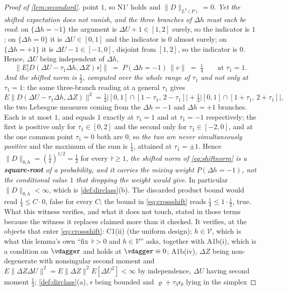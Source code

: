 \begin{proof}[Proof of \cref{lem:secondord}]
point $1$, so N1$'$ holds and $\|D\|_{L^{2}(P)}=0$. \emph{Yet the shifted expectation does not
vanish, and the three branches of $\Delta h$ must each be read}: on $\{\Delta h=-1\}$ the argument is
$\Delta U+1\in[1,2]$ surely, so the indicator is $1$; on $\{\Delta h=0\}$ it is $\Delta U\in[0,1]$ and
the indicator is $0$ almost surely; on $\{\Delta h=+1\}$ it is $\Delta U-1\in[-1,0]$, disjoint from
$[1,2]$, so the indicator is $0$. Hence, $\Delta U$ being independent of $\Delta h$,
\[
\big\|E\big[D(\Delta U-\tau_1\Delta h,\Delta Z)\,\mathsf r\big]\big\|
\;=\;P(\Delta h=-1)\,\|v\|\;=\;\tfrac14
\qquad\text{at }\tau_1=1 .
\]
\emph{And the shifted norm is $\tfrac12$, computed over the whole range of $\tau_1$ and not only at
$\tau_1=1$}: the same three-branch reading at a general $\tau_1$ gives
\[
E\big\|D(\Delta U-\tau_1\Delta h,\Delta Z)\big\|^{2}
=\tfrac14\big|[0,1]\cap[1-\tau_1,\,2-\tau_1]\big|
+\tfrac14\big|[0,1]\cap[1+\tau_1,\,2+\tau_1]\big| ,
\]
the two Lebesgue measures coming from the $\Delta h=-1$ and $\Delta h=+1$ branches. Each is at most
$1$, and equals $1$ exactly at $\tau_1=1$ and at $\tau_1=-1$ respectively; the first is positive only
for $\tau_1\in[0,2]$ and the second only for $\tau_1\in[-2,0]$, and at the one common point $\tau_1=0$
both are $0$, so \emph{the two are never simultaneously positive} and the maximum of the sum is
$\tfrac14$, attained at $\tau_1=\pm1$. Hence
$\|D\|_{0,h}=(\tfrac14)^{1/2}=\tfrac12$ for every $\bar\tau\ge1$, \emph{the shifted norm of
\eqref{eq:shiftnorm} is a \textbf{square-root} of a probability, and it carries the mixing weight
$P(\Delta h=-1)$, not the conditional value $1$ that dropping the weight would give}. In particular
$\|D\|_{0,h}<\infty$, which is \cref{def:dirclass}(b).
The discarded product bound would read $\tfrac14\le C\cdot0$, false for every $C$; the bound in
\eqref{eq:crossshift} reads $\tfrac14\le1\cdot\tfrac12$, true.
What this witness verifies, and what it does not touch, stated in those terms because the
witness it replaces claimed more than it checked. It verifies, at the objects that enter
\eqref{eq:crossshift}: C1(ii) (the uniform design); $h\in\mathcal V$, which is what this lemma's own
``fix $\bar\tau>0$ and $h\in\mathcal V$'' asks, together with A1b(i), which is a condition on $\vdagger$
and holds at $\vdagger\equiv0$;
A1b(iv), $\Delta Z$ being non-degenerate with nonsingular second moment and
$E\|\Delta Z\Delta U\|^{2}=E\|\Delta Z\|^{2}E[\Delta U^{2}]<\infty$ by independence, $\Delta U$ having
second moment $\tfrac13$;
\cref{def:dirclass}(a), $\mathsf r$ being bounded and $\varrho+\tau_3\mathsf r_0$ lying in the simplex

\end{proof}
